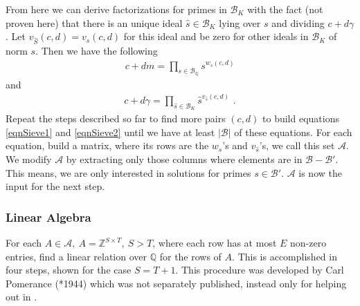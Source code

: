 \documentclass[paper=a4, fontsize=11pt]{scrartcl} %
\numberwithin{equation}{section} %
\numberwithin{figure}{section} %
\numberwithin{table}{section} %
\begin{document}
From here we can derive factorizations for primes in $\mathcal{B}_K$ with the fact (not proven here) that there is an unique ideal $\hat{s}\in\mathcal{B}_K$ lying over $s$ and dividing $c+d\gamma$. Let $v_{\hat{S}}(c,d) = v_s(c,d)$ for this ideal and be zero for other ideals in $\mathcal{B}_K$ of norm $s$. Then we have the following
\begin{eqnarray}
\label{eqnSieve1}
c+dm = \prod_{s\in\mathcal{B}_\mathbb{Q}}s^{w_s(c,d)}
\end{eqnarray}
and
\begin{eqnarray}
\label{eqnSieve2}
c+d\gamma = \prod_{\hat{s}\in\mathcal{B}_K}\hat{s}^{v_{\hat{s}}(c,d)}
\text{ .}
\end{eqnarray}
Repeat the steps described so far to find more pairs $(c,d)$ to build equations \ref{eqnSieve1} and \ref{eqnSieve2} until we have at least $|\mathcal{B}|$ of these equations. For each equation, build a matrix, where its rows are the $w_s$'s and $v_{\hat{s}}$'s, we call this set $\mathcal{A}$. We modify $\mathcal{A}$ by extracting only those columns where elements are in $\mathcal{B}-\mathcal{B}'$. This means, we are only interested in solutions for primes $s\in\mathcal{B}'$. $\mathcal{A}$ is now the input for the next step.

\subsubsection{Linear Algebra}
For each $A \in \mathcal{A},\ A = \mathbb{Z}^{S\times T},\ S > T$, where each row has at most $E$ non-zero entries, find a linear relation over $\mathbb{Q}$ for the rows of $A$. This is accomplished in four steps, shown for the case $S=T+1$. This procedure was developed by Carl Pomerance (*1944) which was not separately published, instead only for helping out in \citep{gordon1993discrete}.
\end{document}
